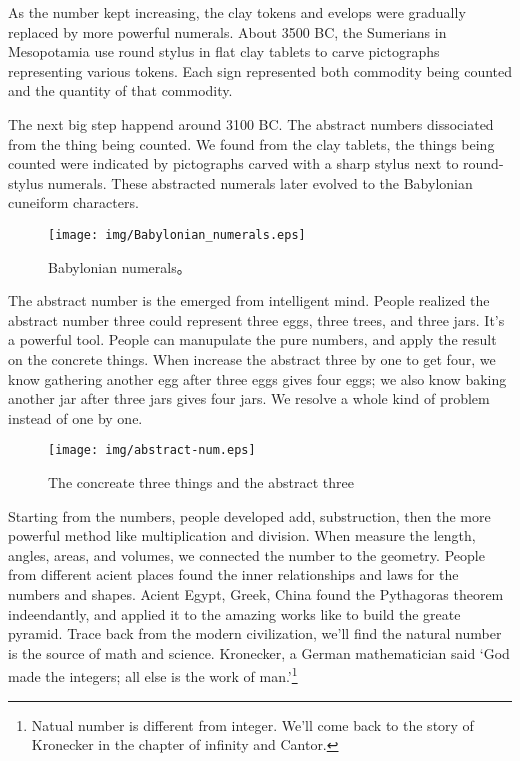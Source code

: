 \documentclass[UTF8]{article}
\begin{document}
As the number kept increasing, the clay tokens and evelops were gradually replaced by more powerful numerals. About 3500 BC, the Sumerians in Mesopotamia use round stylus in flat clay tablets to carve pictographs representing various tokens. Each sign represented both commodity being counted and the quantity of that commodity.

The next big step happend around 3100 BC. The abstract numbers dissociated from the thing being counted. We found from the clay tablets, the things being counted were indicated by pictographs carved with a sharp stylus next to round-stylus numerals. These abstracted numerals later evolved to the Babylonian cuneiform characters.

\begin{figure}[htbp]
 \centering
 \texttt{[image: img/Babylonian\_numerals.eps]}
 \caption{Babylonian numerals\cite{wiki-babylonian-num}。}
 \label{fig:babylonian-num}
\end{figure}

The abstract number is the emerged from intelligent mind. People realized the abstract number three could represent three eggs, three trees, and three jars. It's a powerful tool. People can manupulate the pure numbers, and apply the result on the concrete things. When increase the abstract three by one to get four, we know gathering another egg after three eggs gives four eggs; we also know baking another jar after three jars gives four jars. We resolve a whole kind of problem instead of one by one.

\begin{figure}[htbp]
 \centering
 \texttt{[image: img/abstract-num.eps]}
 \caption{The concreate three things and the abstract three}
 \label{fig:abstract-num}
\end{figure}

Starting from the numbers, people developed add, substruction, then the more powerful method like multiplication and division. When measure the length, angles, areas, and volumes, we connected the number to the geometry. People from different acient places found the inner relationships and laws for the numbers and shapes. Acient Egypt, Greek, China found the Pythagoras theorem indeendantly, and applied it to the amazing works like to build the greate pyramid. Trace back from the modern civilization, we'll find the natural number is the source of math and science. Kronecker, a German mathematician said `God made the integers; all else is the work of man.'\footnote{Natual number is different from integer. We'll come back to the story of Kronecker in the chapter of infinity and Cantor.}
\end{document}

